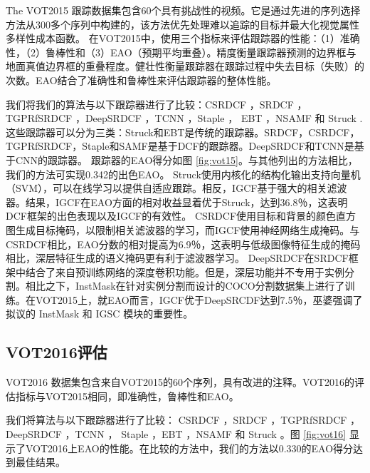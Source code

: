 The VOT2015 \cite{Kristan2015TheVO} 跟踪数据集包含60个具有挑战性的视频。它是通过先进的序列选择方法从300多个序列中构建的，该方法优先处理难以追踪的目标并最大化视觉属性多样性成本函数。
在VOT2015中，使用三个指标来评估跟踪器的性能：（1）准确性，（2）鲁棒性和（3）EAO（预期平均重叠）。精度衡量跟踪器预测的边界框与地面真值边界框的重叠程度。健壮性衡量跟踪器在跟踪过程中失去目标（失败）的次数。EAO结合了准确性和鲁棒性来评估跟踪器的整体性能。

我们将我们的算法与以下跟踪器进行了比较：CSRDCF \cite{Lukezic2017DiscriminativeCF}，SRDCF \cite{Danelljan2015LearningSR}，TGPRfSRDCF \cite{gao2018tracking}，DeepSRDCF \cite{Danelljan2015ConvolutionalFF}，TCNN \cite{nam2016modeling}，Staple \cite{Bertinetto2016StapleC}， EBT \cite{Zhu2016BeyondLS}，NSAMF \cite{Hua2015OnlineOT} 和 Struck \cite{Hare2011StruckSO}.
这些跟踪器可以分为三类：Struck和EBT是传统的跟踪器。SRDCF，CSRDCF，TGPRfSRDCF，Staple和SAMF是基于DCF的跟踪器。DeepSRDCF和TCNN是基于CNN的跟踪器。
跟踪器的EAO得分如图 \ref{fig:vot15}。与其他列出的方法相比，我们的方法可实现0.342的出色EAO。
Struck使用内核化的结构化输出支持向量机（SVM），可以在线学习以提供自适应跟踪。相反，IGCF基于强大的相关滤波器。结果，IGCF在EAO方面的相对收益显着优于Struck，达到36.8％，这表明DCF框架的出色表现以及IGCF的有效性。
CSRDCF使用目标和背景的颜色直方图生成目标掩码，以限制相关滤波器的学习，而IGCF使用神经网络生成掩码。与CSRDCF相比，EAO分数的相对提高为6.9％，这表明与低级图像特征生成的掩码相比，深层特征生成的语义掩码更有利于滤波器学习。
DeepSRDCF在SRDCF框架中结合了来自预训练网络的深度卷积功能。但是，深层功能并不专用于实例分割。相比之下，InstMask在针对实例分割而设计的COCO分割数据集上进行了训练。在VOT2015上，就EAO而言，IGCF优于DeepSRCDF达到7.5％，巫婆强调了拟议的 InstMask 和 IGSC 模块的重要性。

\subsection{VOT2016评估}
VOT2016 \cite{Kristan2016TheVO} 数据集包含来自VOT2015的60个序列，具有改进的注释。VOT2016的评估指标与VOT2015相同，即准确性，鲁棒性和EAO。

我们将算法与以下跟踪器进行了比较：
CSRDCF \cite{Lukezic2017DiscriminativeCF}，SRDCF \cite{Danelljan2015LearningSR}，TGPRfSRDCF \cite{gao2018tracking}，DeepSRDCF \cite{Danelljan2015ConvolutionalFF}，TCNN \cite{nam2016modeling}， Staple \cite{Bertinetto2016StapleC}，EBT \cite{Zhu2016BeyondLS}，NSAMF \cite{Hua2015OnlineOT} 和 Struck \cite{Hare2011StruckSO}。图 \ref{fig:vot16} 显示了VOT2016上EAO的性能。在比较的方法中，我们的方法以0.330的EAO得分达到最佳结果。

